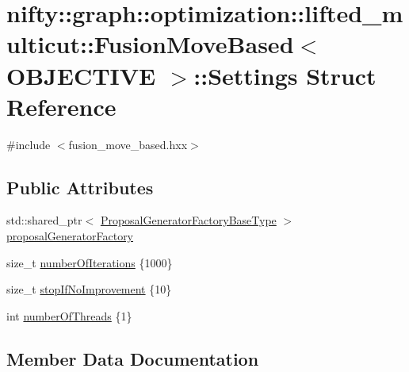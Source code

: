 \hypertarget{structnifty_1_1graph_1_1optimization_1_1lifted__multicut_1_1FusionMoveBased_1_1Settings}{}\section{nifty\+:\+:graph\+:\+:optimization\+:\+:lifted\+\_\+multicut\+:\+:Fusion\+Move\+Based$<$ O\+B\+J\+E\+C\+T\+I\+V\+E $>$\+:\+:Settings Struct Reference}
\label{structnifty_1_1graph_1_1optimization_1_1lifted__multicut_1_1FusionMoveBased_1_1Settings}


{\ttfamily \#include $<$fusion\+\_\+move\+\_\+based.\+hxx$>$}

\subsection*{Public Attributes}
\begin{DoxyCompactItemize}
\item 
std\+::shared\+\_\+ptr$<$ \hyperlink{classnifty_1_1graph_1_1optimization_1_1lifted__multicut_1_1FusionMoveBased_a7ce904e15086b0dffc73d1fc35a1f7ac}{Proposal\+Generator\+Factory\+Base\+Type} $>$ \hyperlink{structnifty_1_1graph_1_1optimization_1_1lifted__multicut_1_1FusionMoveBased_1_1Settings_adfef4157f175b37293f49ff31d5ca8dc}{proposal\+Generator\+Factory}
\item 
size\+\_\+t \hyperlink{structnifty_1_1graph_1_1optimization_1_1lifted__multicut_1_1FusionMoveBased_1_1Settings_a6a03fa77c6402c25a238f7c8d638a8dc}{number\+Of\+Iterations} \{1000\}
\item 
size\+\_\+t \hyperlink{structnifty_1_1graph_1_1optimization_1_1lifted__multicut_1_1FusionMoveBased_1_1Settings_a8f2f80046bc6f9887bdf936be099d4cb}{stop\+If\+No\+Improvement} \{10\}
\item 
int \hyperlink{structnifty_1_1graph_1_1optimization_1_1lifted__multicut_1_1FusionMoveBased_1_1Settings_ad38d6fa3c583ffcf5cb7b537b7a9e359}{number\+Of\+Threads} \{1\}
\end{DoxyCompactItemize}


\subsection{Member Data Documentation}
\hypertarget{structnifty_1_1graph_1_1optimization_1_1lifted__multicut_1_1FusionMoveBased_1_1Settings_a6a03fa77c6402c25a238f7c8d638a8dc}{}
